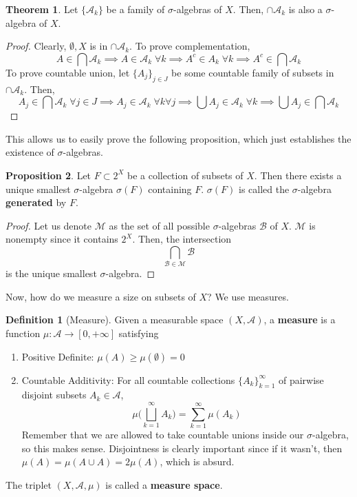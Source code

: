 \documentclass{article}
\theoremstyle{definition}
\newtheorem{theorem}{Theorem}[section]
\newtheorem{proposition}[theorem]{Proposition}
\theoremstyle{remark}
\theoremstyle{definition}
\newtheorem{definition}{Definition}[section]
\begin{document}
\begin{theorem}
Let $\{\mathcal{A}_k\}$ be a family of $\sigma$-algebras of $X$. Then, $\cap \mathcal{A}_k$ is also a $\sigma$-algebra of $X$. 
\end{theorem}
\begin{proof}
Clearly, $\emptyset, X$ is in $\cap \mathcal{A}_k$. To prove complementation, 
\[A \in \bigcap \mathcal{A}_k \implies A \in \mathcal{A}_k \; \forall k \implies A^c \in A_k \; \forall k \implies A^c \in \bigcap \mathcal{A}_k\] 
To prove countable union, let $\{A_j\}_{j \in J}$ be some countable family of subsets in $\cap \mathcal{A}_k$. Then, 
\[A_j \in \bigcap \mathcal{A}_k \; \forall j \in J \implies A_j \in \mathcal{A}_k \; \forall k \forall j \implies \bigcup A_j \in \mathcal{A}_k \; \forall k \implies \bigcup A_j \in \bigcap \mathcal{A}_k\]
\end{proof}

This allows us to easily prove the following proposition, which just establishes the existence of $\sigma$-algebras. 

\begin{proposition}
Let $F \subset 2^X$ be a collection of subsets of $X$. Then there exists a unique smallest $\sigma$-algebra $\sigma(F)$ containing $F$. $\sigma(F)$ is called the $\sigma$-algebra \textbf{generated} by $F$. 
\end{proposition}
\begin{proof}
Let us denote $\mathcal{M}$ as the set of all possible $\sigma$-algebras $\mathcal{B}$ of $X$. $\mathcal{M}$ is nonempty since it contains $2^X$. Then, the intersection 
\[\bigcap_{\mathcal{B} \in \mathcal{M}} \mathcal{B}\]
is the unique smallest $\sigma$-algebra. 
\end{proof}

Now, how do we measure a size on subsets of $X$? We use measures. 

\begin{definition}[Measure]
Given a measurable space $(X, \mathcal{A})$, a \textbf{measure} is a function $\mu : \mathcal{A} \longrightarrow [0, +\infty]$ satisfying 
\begin{enumerate}
    \item Positive Definite: $\mu(A) \geq \mu(\emptyset) = 0$ 
    \item Countable Additivity: For all countable collections $\{A_k\}_{k=1}^\infty$ of pairwise disjoint subsets $A_k \in \mathcal{A}$, 
    \[\mu \bigg( \bigsqcup_{k=1}^\infty A_k \bigg) = \sum_{k=1}^\infty \mu(A_k)\]
    Remember that we are allowed to take countable unions inside our $\sigma$-algebra, so this makes sense. Disjointness is clearly important since if it wasn't, then $\mu(A) = \mu(A \cup A) = 2 \mu(A)$, which is absurd. 
\end{enumerate}
The triplet $(X, \mathcal{A}, \mu)$ is called a \textbf{measure space}. 
\end{definition}
\end{document}
